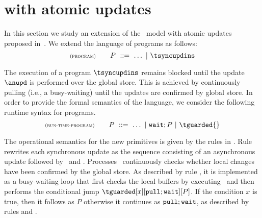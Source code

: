 
\section{{\gsp} with atomic updates}
\label{sec:transactions}

In this section we study an extension of the \gsp\ model with atomic updates proposed in~\cite{DBLP:conf/ecoop/BurckhardtLPF15}. 
We extend the language of programs as follows: 
\[
 \rName{program} 
			 \qquad 
			 \tprogram \ ::=\  \ldots\ |\ \tsyncupdins 
\]

The execution of a program  $\tsyncupdins$ remains blocked until the 
update $\anupd$ is performed over the global store.  This is achieved by continuously pulling (i.e., 
a busy-waiting) until the updates are confirmed by global store. In order to provide 
the formal semantics of the language, we consider the following 
runtime syntax for programs.
\[
 \rName{run-time-program} 
			 \qquad 
			 \tprogram \ ::=\  \ldots\  |\ \waitcmd;P \ |\ \tguarded{} 
			 \]

			 

The operational semantics for the new primitives is given by the rules in 
.  Rule  rewrites each synchronous update as
the sequence consisting of an asynchronous update followed by \pullcmd\ and  \waitcmd. 
Processes \waitcmd\  continuously checks whether  local changes have been confirmed by 
the global store. As described by rule , it is implemented as a busy-waiting
loop that first checks the local buffers by executing \confcmd\ and then
performs the conditional jump $\tguarded[x][\pullcmd;\waitcmd][P]$.  
If the condition $x$ is true, then it follows as $P$ otherwise it continues as 
${\tt pull};{\tt wait}$, as described by rules  and .
  
